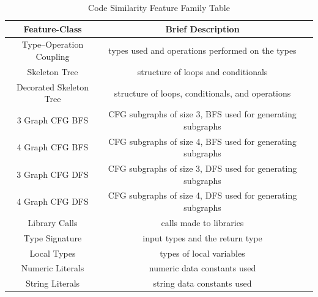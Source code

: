 \begin{table}[h]
\centering
\begin{threeparttable}[b]
\caption{Code Similarity Feature Family Table}
\label{table:search-similarity}
\begin{tabular}{ccc} \toprule
    {Feature-Class} & {Brief Description} \\ \midrule
Type–Operation Coupling & types used and operations performed on the types \\
Skeleton Tree & structure of loops and conditionals \\
Decorated Skeleton Tree & structure of loops, conditionals, and operations \\
3 Graph CFG BFS & CFG subgraphs of size 3, BFS used for generating subgraphs \\
4 Graph CFG BFS & CFG subgraphs of size 4, BFS used for generating subgraphs \\
3 Graph CFG DFS & CFG subgraphs of size 3, DFS used for generating subgraphs \\
4 Graph CFG DFS & CFG subgraphs of size 4, DFS used for generating subgraphs \\
Library Calls & calls made to libraries \\
Type Signature & input types and the return type \\
Local Types & types of local variables \\
Numeric Literals & numeric data constants used \\
String Literals & string data constants used \\
\bottomrule                                                   
\end{tabular}
\end{threeparttable}
\end{table}


